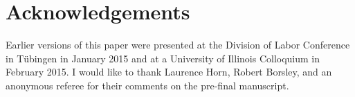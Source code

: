 \documentclass[output=paper,
modfonts
]{LSP/langsci}
\begin{document}
\section*{Acknowledgements}
Earlier versions of this paper were
  presented at the Division of Labor Conference in Tübingen in January
  2015 and at a University of Illinois Colloquium in February 2015. I
  would like to thank Laurence Horn, Robert Borsley, and an anonymous
  referee for their comments on the pre-final manuscript.

\printbibliography[heading=subbibliography,notkeyword=this]

\end{document}
